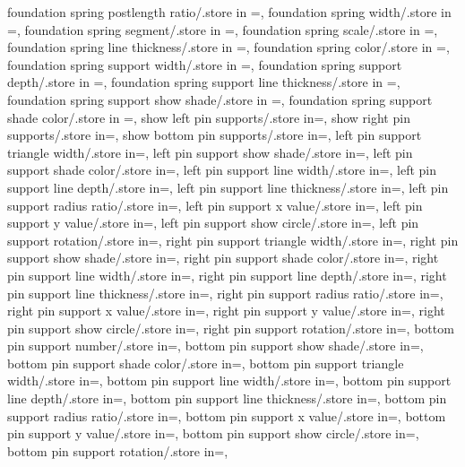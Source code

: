 {foundation spring postlength ratio/.store in =\foundpostlenratio,
foundation spring width/.store in =\foundampl,
foundation spring segment/.store in =\foundsegm,
foundation spring scale/.store in =\foundspringscale,
foundation spring line thickness/.store in =\foundspringthk,
foundation spring color/.store in =\foundspringcolor,
foundation spring support width/.store in =\foundsuppwidth,
foundation spring support depth/.store in =\foundsuppdepth,
foundation spring support line thickness/.store in =\foundsupplinethk,
foundation spring support show shade/.store in =\foundshowsuppshade,
foundation spring support shade color/.store in =\foundsuppshadecol,
show left pin supports/.store in=\showleftpinsup,
show right pin supports/.store in=\showrightpinsup,
show bottom pin supports/.store in=\showbottompinsup,
left pin support triangle width/.store in=\lefttriw,
left pin support show shade/.store in=\showleftpinsuppshade,
left pin support shade color/.store in=\leftpinsuppshadecolor,
left pin support line width/.store in=\leftlinew,
left pin support line depth/.store in=\leftlined,
left pin support line thickness/.store in=\leftlinet,
left pin support radius ratio/.store in=\leftradratio,
left pin support x value/.store in=\leftxvalue,
left pin support y value/.store in=\leftyvalue,
left pin support show circle/.store in=\leftshowcircle,
left pin support rotation/.store in=\leftrotpin,
right pin support triangle width/.store in=\righttriw,
right pin support show shade/.store in=\showrightpinsuppshade,
right pin support shade color/.store in=\rightpinsuppshadecolor,
right pin support line width/.store in=\rightlinew,
right pin support line depth/.store in=\rightlined,
right pin support line thickness/.store in=\rightlinet,
right pin support radius ratio/.store in=\rightradratio,
right pin support x value/.store in=\rightxvalue,
right pin support y value/.store in=\rightyvalue,
right pin support show circle/.store in=\rightshowcircle,
right pin support rotation/.store in=\rightrotpin,
bottom pin support number/.store in=\nbotpin,
bottom pin support show shade/.store in=\showbottompinsuppshade,
bottom pin support shade color/.store in=\bottompinsuppshadecolor,
bottom pin support triangle width/.store in=\bottomtriw,
bottom pin support line width/.store in=\bottomlinew,
bottom pin support line depth/.store in=\bottomlined,
bottom pin support line thickness/.store in=\bottomlinet,
bottom pin support radius ratio/.store in=\bottomradratio,
bottom pin support x value/.store in=\bottomxvalue,
bottom pin support y value/.store in=\bottomyvalue,
bottom pin support show circle/.store in=\bottomshowcircle,
bottom pin support rotation/.store in=\bottomrotpin,}
